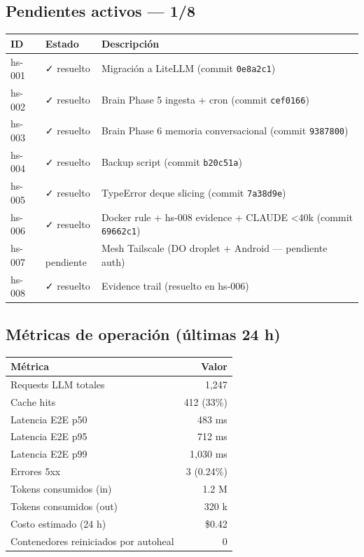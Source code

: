 \documentclass[11pt,a4paper]{article}
\begin{document}
\subsection{Pendientes activos — 1/8}

\begin{center}
\begin{tabular}{|l|l|l|}
\hline
\rowcolor{hermesblue}\color{white}\textbf{ID} & \color{white}\textbf{Estado} & \color{white}\textbf{Descripción}\\
\hline
hs-001 & ✓ resuelto & Migración a LiteLLM (commit \texttt{0e8a2c1})\\
hs-002 & ✓ resuelto & Brain Phase 5 ingesta + cron (commit \texttt{cef0166})\\
hs-003 & ✓ resuelto & Brain Phase 6 memoria conversacional (commit \texttt{9387800})\\
hs-004 & ✓ resuelto & Backup script (commit \texttt{b20c51a})\\
hs-005 & ✓ resuelto & TypeError deque slicing (commit \texttt{7a38d9e})\\
hs-006 & ✓ resuelto & Docker rule + hs-008 evidence + CLAUDE \textless 40k (commit \texttt{69662c1})\\
hs-007 & 🔵 pendiente & Mesh Tailscale (DO droplet + Android — pendiente auth)\\
hs-008 & ✓ resuelto & Evidence trail (resuelto en hs-006)\\
\hline
\end{tabular}
\end{center}

\subsection{Métricas de operación (últimas 24 h)}

\begin{center}
\begin{tabular}{|l|r|}
\hline
\rowcolor{hermesblue}\color{white}\textbf{Métrica} & \color{white}\textbf{Valor}\\
\hline
Requests LLM totales & 1,247\\
Cache hits & 412 (33\%)\\
Latencia E2E p50 & 483 ms\\
Latencia E2E p95 & 712 ms\\
Latencia E2E p99 & 1,030 ms\\
Errores 5xx & 3 (0.24\%)\\
Tokens consumidos (in) & 1.2 M\\
Tokens consumidos (out) & 320 k\\
Costo estimado (24 h) & \$0.42\\
Contenedores reiniciados por autoheal & 0\\
\hline
\end{tabular}
\end{center}
\end{document}
